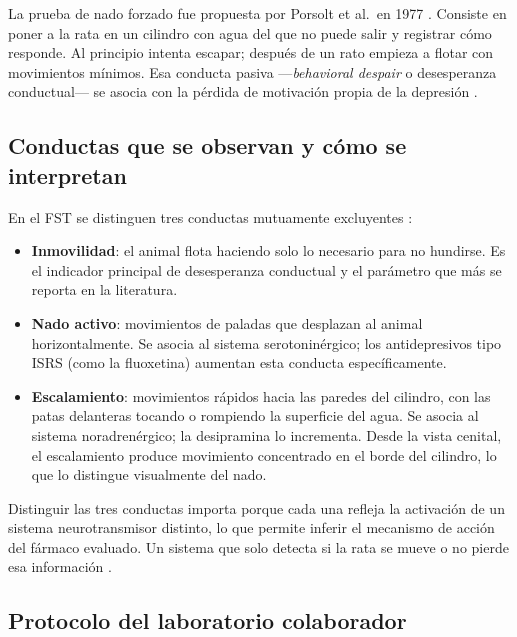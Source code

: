 La prueba de nado forzado fue propuesta por Porsolt et al.\ en 1977 \cite{porsolt1977}.
Consiste en poner a la rata en un cilindro con agua del que no puede salir y registrar
cómo responde. Al principio intenta escapar; después de un rato empieza a flotar con
movimientos mínimos. Esa conducta pasiva ---\textit{behavioral despair} o desesperanza
conductual--- se asocia con la pérdida de motivación propia de la depresión
\cite{armario2021}.

\subsection{Conductas que se observan y cómo se interpretan}

En el FST se distinguen tres conductas mutuamente excluyentes \cite{armario2021,cryan2005}:

\begin{itemize}
    \item \textbf{Inmovilidad}: el animal flota haciendo solo lo necesario para no
          hundirse. Es el indicador principal de desesperanza conductual y el parámetro
          que más se reporta en la literatura.

    \item \textbf{Nado activo}: movimientos de paladas que desplazan al animal
          horizontalmente. Se asocia al sistema serotoninérgico; los antidepresivos tipo
          ISRS (como la fluoxetina) aumentan esta conducta específicamente.

    \item \textbf{Escalamiento}: movimientos rápidos hacia las paredes del cilindro,
          con las patas delanteras tocando o rompiendo la superficie del agua. Se asocia
          al sistema noradrenérgico; la desipramina lo incrementa. Desde la vista
          cenital, el escalamiento produce movimiento concentrado en el borde del
          cilindro, lo que lo distingue visualmente del nado.
\end{itemize}

Distinguir las tres conductas importa porque cada una refleja la activación de un sistema
neurotransmisor distinto, lo que permite inferir el mecanismo de acción del fármaco
evaluado. Un sistema que solo detecta si la rata se mueve o no pierde esa información
\cite{della_valle2025}.

\subsection{Protocolo del laboratorio colaborador}

